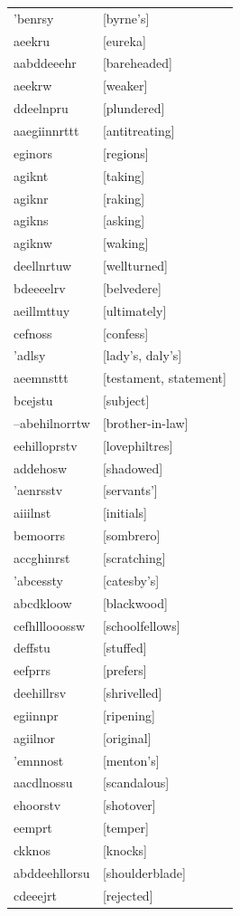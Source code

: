 \documentclass{article}
\begin{document}
\begin{tabular}{ll}
'benrsy & [byrne's] \\
aeekru & [eureka] \\
aabddeeehr & [bareheaded] \\
aeekrw & [weaker] \\
ddeelnpru & [plundered] \\
aaegiinnrttt & [antitreating] \\
eginors & [regions] \\
agiknt & [taking] \\
agiknr & [raking] \\
agikns & [asking] \\
agiknw & [waking] \\
deellnrtuw & [wellturned] \\
bdeeeelrv & [belvedere] \\
aeillmttuy & [ultimately] \\
cefnoss & [confess] \\
'adlsy & [lady's, daly's] \\
aeemnsttt & [testament, statement] \\
bcejstu & [subject] \\
--abehilnorrtw & [brother-in-law] \\
eehilloprstv & [lovephiltres] \\
addehosw & [shadowed] \\
'aenrsstv & [servants'] \\
aiiilnst & [initials] \\
bemoorrs & [sombrero] \\
accghinrst & [scratching] \\
'abcessty & [catesby's] \\
abcdkloow & [blackwood] \\
cefhlllooossw & [schoolfellows] \\
deffstu & [stuffed] \\
eefprrs & [prefers] \\
deehillrsv & [shrivelled] \\
egiinnpr & [ripening] \\
agiilnor & [original] \\
'emnnost & [menton's] \\
aacdlnossu & [scandalous] \\
ehoorstv & [shotover] \\
eemprt & [temper] \\
ckknos & [knocks] \\
abddeehllorsu & [shoulderblade] \\
cdeeejrt & [rejected] \\

\end{tabular}
\end{document}

